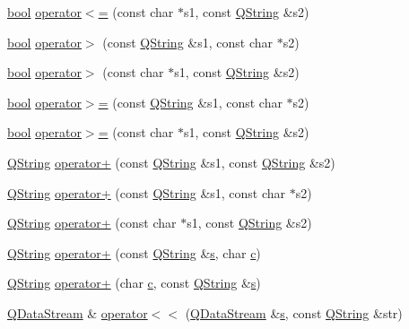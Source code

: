 \begin{DoxyCompactItemize}
\item 
\hyperlink{qglobal_8h_a1062901a7428fdd9c7f180f5e01ea056}{bool} \hyperlink{class_q_string_a98d7107dd1903d01a5fabeab999fe398}{operator$<$=} (const char $\ast$s1, const \hyperlink{class_q_string}{Q\+String} \&s2)
\item 
\hyperlink{qglobal_8h_a1062901a7428fdd9c7f180f5e01ea056}{bool} \hyperlink{class_q_string_ab0ce893122b9d85769be403013196aed}{operator$>$} (const \hyperlink{class_q_string}{Q\+String} \&s1, const char $\ast$s2)
\item 
\hyperlink{qglobal_8h_a1062901a7428fdd9c7f180f5e01ea056}{bool} \hyperlink{class_q_string_a382b1ef4a8de8768259b825b534fcda1}{operator$>$} (const char $\ast$s1, const \hyperlink{class_q_string}{Q\+String} \&s2)
\item 
\hyperlink{qglobal_8h_a1062901a7428fdd9c7f180f5e01ea056}{bool} \hyperlink{class_q_string_a19a6ef539052453895b39db1f25ec5a2}{operator$>$=} (const \hyperlink{class_q_string}{Q\+String} \&s1, const char $\ast$s2)
\item 
\hyperlink{qglobal_8h_a1062901a7428fdd9c7f180f5e01ea056}{bool} \hyperlink{class_q_string_a9f4787df63780750a94f131e7a35ac6c}{operator$>$=} (const char $\ast$s1, const \hyperlink{class_q_string}{Q\+String} \&s2)
\item 
\hyperlink{class_q_string}{Q\+String} \hyperlink{class_q_string_ae485733155e818a24470bab6b39007a3}{operator+} (const \hyperlink{class_q_string}{Q\+String} \&s1, const \hyperlink{class_q_string}{Q\+String} \&s2)
\item 
\hyperlink{class_q_string}{Q\+String} \hyperlink{class_q_string_aeebc8da866e999cf9d98f409149a7274}{operator+} (const \hyperlink{class_q_string}{Q\+String} \&s1, const char $\ast$s2)
\item 
\hyperlink{class_q_string}{Q\+String} \hyperlink{class_q_string_ad31066c16adb556c4e773939da16a894}{operator+} (const char $\ast$s1, const \hyperlink{class_q_string}{Q\+String} \&s2)
\item 
\hyperlink{class_q_string}{Q\+String} \hyperlink{class_q_string_a646dae5a832bf142e3fd6eed4cd29263}{operator+} (const \hyperlink{class_q_string}{Q\+String} \&\hyperlink{060__command__switch_8tcl_a011c73f2dbb87635a3b4206c72355f6e}{s}, char \hyperlink{060__command__switch_8tcl_ab14f56bc3bd7680490ece4ad7815465f}{c})
\item 
\hyperlink{class_q_string}{Q\+String} \hyperlink{class_q_string_ab79668b32f01247149267b5b77669165}{operator+} (char \hyperlink{060__command__switch_8tcl_ab14f56bc3bd7680490ece4ad7815465f}{c}, const \hyperlink{class_q_string}{Q\+String} \&\hyperlink{060__command__switch_8tcl_a011c73f2dbb87635a3b4206c72355f6e}{s})
\item 
\hyperlink{class_q_data_stream}{Q\+Data\+Stream} \& \hyperlink{class_q_string_a5d8281fc5ce5c2b6e6e9fd2b9f66c32c}{operator$<$$<$} (\hyperlink{class_q_data_stream}{Q\+Data\+Stream} \&\hyperlink{060__command__switch_8tcl_a011c73f2dbb87635a3b4206c72355f6e}{s}, const \hyperlink{class_q_string}{Q\+String} \&str)
\end{DoxyCompactItemize}


